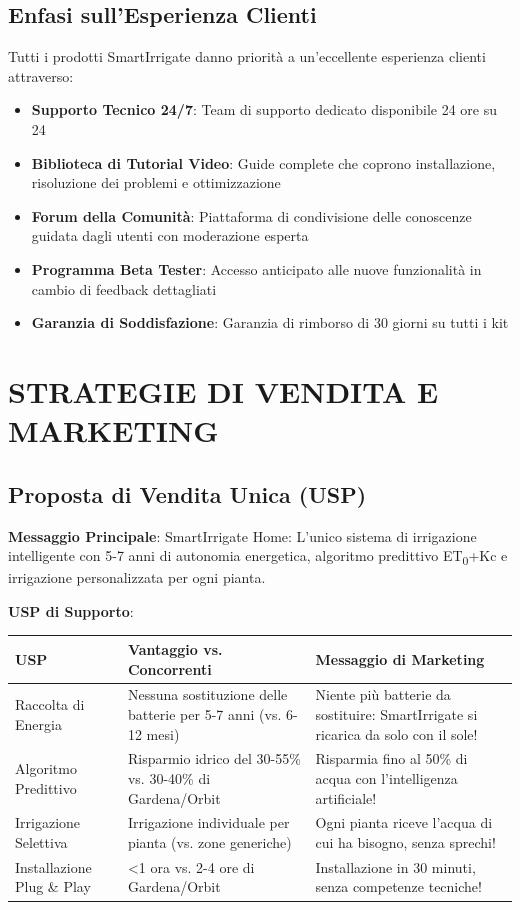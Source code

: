 \documentclass[11pt,a4paper]{report}
\begin{document}
\section{Enfasi sull'Esperienza Clienti}
Tutti i prodotti SmartIrrigate danno priorità a un'eccellente esperienza clienti attraverso:
\begin{itemize}
    \item \textbf{Supporto Tecnico 24/7}: Team di supporto dedicato disponibile 24 ore su 24
    \item \textbf{Biblioteca di Tutorial Video}: Guide complete che coprono installazione, risoluzione dei problemi e ottimizzazione
    \item \textbf{Forum della Comunità}: Piattaforma di condivisione delle conoscenze guidata dagli utenti con moderazione esperta
    \item \textbf{Programma Beta Tester}: Accesso anticipato alle nuove funzionalità in cambio di feedback dettagliati
    \item \textbf{Garanzia di Soddisfazione}: Garanzia di rimborso di 30 giorni su tutti i kit
\end{itemize}

\chapter{STRATEGIE DI VENDITA E MARKETING}

\section{Proposta di Vendita Unica (USP)}
\textbf{Messaggio Principale}: SmartIrrigate Home: L'unico sistema di irrigazione intelligente con 5-7 anni di autonomia energetica, algoritmo predittivo ET\textsubscript{0}+Kc e irrigazione personalizzata per ogni pianta.

\textbf{USP di Supporto}:

\begin{longtable}{|p{3cm}|p{4cm}|p{4cm}|}
\hline
\textbf{USP} & \textbf{Vantaggio vs. Concorrenti} & \textbf{Messaggio di Marketing} \\ \hline
Raccolta di Energia & Nessuna sostituzione delle batterie per 5-7 anni (vs. 6-12 mesi) & Niente più batterie da sostituire: SmartIrrigate si ricarica da solo con il sole! \\ \hline
Algoritmo Predittivo & Risparmio idrico del 30-55\% vs. 30-40\% di Gardena/Orbit & Risparmia fino al 50\% di acqua con l'intelligenza artificiale! \\ \hline
Irrigazione Selettiva & Irrigazione individuale per pianta (vs. zone generiche) & Ogni pianta riceve l'acqua di cui ha bisogno, senza sprechi! \\ \hline
Installazione Plug \& Play & <1 ora vs. 2-4 ore di Gardena/Orbit & Installazione in 30 minuti, senza competenze tecniche! \\ \hline
\end{longtable}
\end{document}
